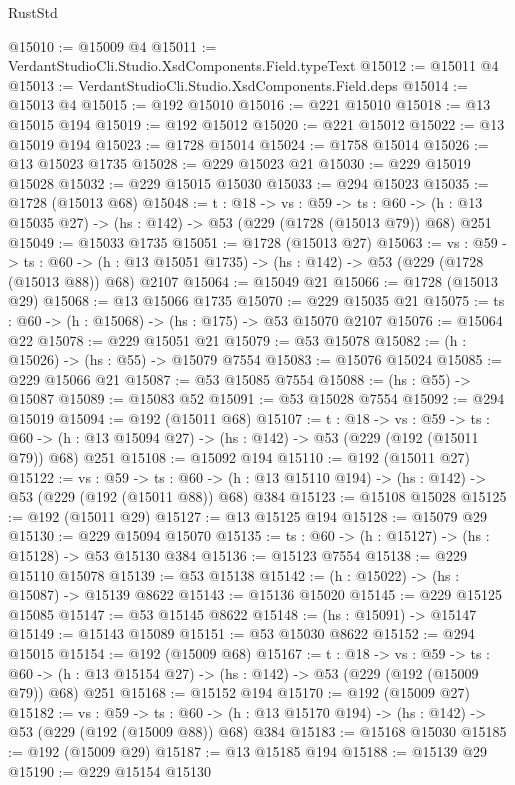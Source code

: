 \begin{lexlean}{RustStd}
\begin{coremodule}
@15010 := @15009 @4
@15011 := VerdantStudioCli.Studio.XsdComponents.Field.typeText
@15012 := @15011 @4
@15013 := VerdantStudioCli.Studio.XsdComponents.Field.deps
@15014 := @15013 @4
@15015 := @192 @15010
@15016 := @221 @15010
@15018 := @13 @15015 @194
@15019 := @192 @15012
@15020 := @221 @15012
@15022 := @13 @15019 @194
@15023 := @1728 @15014
@15024 := @1758 @15014
@15026 := @13 @15023 @1735
@15028 := @229 @15023 @21
@15030 := @229 @15019 @15028
@15032 := @229 @15015 @15030
@15033 := @294 @15023
@15035 := @1728 (@15013 @68)
@15048 := {t : @18} ->
  {vs : @59} ->
  {ts : @60} -> (h : @13 @15035 @27) -> (hs : @142) -> @53 (@229 (@1728 (@15013 @79)) @68) @251
@15049 := @15033 @1735
@15051 := @1728 (@15013 @27)
@15063 := {vs : @59} ->
  {ts : @60} -> (h : @13 @15051 @1735) -> (hs : @142) -> @53 (@229 (@1728 (@15013 @88)) @68) @2107
@15064 := @15049 @21
@15066 := @1728 (@15013 @29)
@15068 := @13 @15066 @1735
@15070 := @229 @15035 @21
@15075 := {ts : @60} -> (h : @15068) -> (hs : @175) -> @53 @15070 @2107
@15076 := @15064 @22
@15078 := @229 @15051 @21
@15079 := @53 @15078
@15082 := (h : @15026) -> (hs : @55) -> @15079 @7554
@15083 := @15076 @15024
@15085 := @229 @15066 @21
@15087 := @53 @15085 @7554
@15088 := (hs : @55) -> @15087
@15089 := @15083 @52
@15091 := @53 @15028 @7554
@15092 := @294 @15019
@15094 := @192 (@15011 @68)
@15107 := {t : @18} ->
  {vs : @59} ->
  {ts : @60} -> (h : @13 @15094 @27) -> (hs : @142) -> @53 (@229 (@192 (@15011 @79)) @68) @251
@15108 := @15092 @194
@15110 := @192 (@15011 @27)
@15122 := {vs : @59} ->
  {ts : @60} -> (h : @13 @15110 @194) -> (hs : @142) -> @53 (@229 (@192 (@15011 @88)) @68) @384
@15123 := @15108 @15028
@15125 := @192 (@15011 @29)
@15127 := @13 @15125 @194
@15128 := @15079 @29
@15130 := @229 @15094 @15070
@15135 := {ts : @60} -> (h : @15127) -> (hs : @15128) -> @53 @15130 @384
@15136 := @15123 @7554
@15138 := @229 @15110 @15078
@15139 := @53 @15138
@15142 := (h : @15022) -> (hs : @15087) -> @15139 @8622
@15143 := @15136 @15020
@15145 := @229 @15125 @15085
@15147 := @53 @15145 @8622
@15148 := (hs : @15091) -> @15147
@15149 := @15143 @15089
@15151 := @53 @15030 @8622
@15152 := @294 @15015
@15154 := @192 (@15009 @68)
@15167 := {t : @18} ->
  {vs : @59} ->
  {ts : @60} -> (h : @13 @15154 @27) -> (hs : @142) -> @53 (@229 (@192 (@15009 @79)) @68) @251
@15168 := @15152 @194
@15170 := @192 (@15009 @27)
@15182 := {vs : @59} ->
  {ts : @60} -> (h : @13 @15170 @194) -> (hs : @142) -> @53 (@229 (@192 (@15009 @88)) @68) @384
@15183 := @15168 @15030
@15185 := @192 (@15009 @29)
@15187 := @13 @15185 @194
@15188 := @15139 @29
@15190 := @229 @15154 @15130

\end{coremodule}
\end{lexlean}
